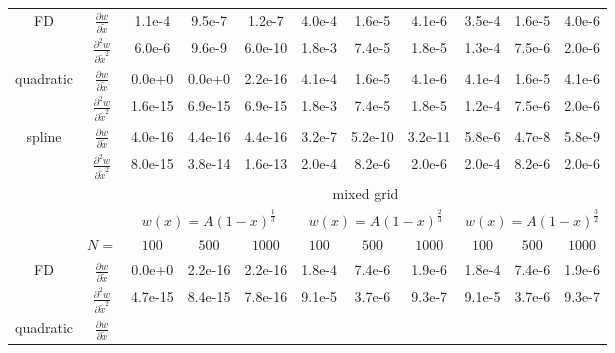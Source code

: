 \begin{tabular}{cc|c|c|c|c|c|c|c|c|c|}
\\ \cline{1-11}
\multicolumn{1}{|c|}{\multirow{2}{*}{FD}} &
\multicolumn{1}{|c|}{$\frac{\partial w}{\partial \tilde x}$}
  &1.1e-4  &9.5e-7  &1.2e-7  &4.0e-4  &1.6e-5  &4.1e-6  &3.5e-4  &1.6e-5  &4.0e-6
\\ \cline{2-11}
\multicolumn{1}{|c|}{}                        &
\multicolumn{1}{|c|}{$\frac{\partial^2 w}{\partial \tilde x^2}$}
  &6.0e-6  &9.6e-9  &6.0e-10  &1.8e-3  &7.4e-5  &1.8e-5  &1.3e-4  &7.5e-6  &2.0e-6
\\ \cline{1-11}
\multicolumn{1}{|c|}{\multirow{2}{*}{quadratic}} &
\multicolumn{1}{|c|}{$\frac{\partial w}{\partial \tilde x}$}
  &0.0e+0  &0.0e+0  &2.2e-16  &4.1e-4  &1.6e-5  &4.1e-6  &4.1e-4  &1.6e-5  &4.1e-6
\\ \cline{2-11}
\multicolumn{1}{|c|}{}                        &
\multicolumn{1}{|c|}{$\frac{\partial^2 w}{\partial \tilde x^2}$}
  &1.6e-15  &6.9e-15  &6.9e-15  &1.8e-3  &7.4e-5  &1.8e-5  &1.2e-4  &7.5e-6  &2.0e-6
\\ \cline{1-11}
\multicolumn{1}{|c|}{\multirow{2}{*}{spline}} &
\multicolumn{1}{|c|}{$\frac{\partial w}{\partial \tilde x}$}
  &4.0e-16  &4.4e-16  &4.4e-16  &3.2e-7  &5.2e-10  &3.2e-11  &5.8e-6  &4.7e-8  &5.8e-9
\\ \cline{2-11}
\multicolumn{1}{|c|}{}                        &
\multicolumn{1}{|c|}{$\frac{\partial^2 w}{\partial \tilde x^2}$}
  &8.0e-15  &3.8e-14  &1.6e-13  &2.0e-4  &8.2e-6  &2.0e-6  &2.0e-4  &8.2e-6  &2.0e-6
\\ \cline{1-11}
& & \multicolumn{9}{|c|}{mixed grid}
\\ \cline{3-11}
& & \multicolumn{3}{|c|}{$w(x)=A(1-x)^\frac{1}{3}$} &  \multicolumn{3}{|c|}{$w(x)=A(1-x)^\frac{2}{3}$} &  \multicolumn{3}{|c|}{$w(x)=A(1-x)^\frac{3}{2}$}
\\ \cline{2-11}
& \multicolumn{1}{|c|}{$N=$} & $100$ & $500$ & $1000$ & $100$ & $500$ & $1000$ & $100$ & $500$ & $1000$
\\ \cline{1-11}
\multicolumn{1}{|c|}{\multirow{2}{*}{FD}} &
\multicolumn{1}{|c|}{$\frac{\partial w}{\partial \tilde x}$}
  &0.0e+0  &2.2e-16  &2.2e-16  &1.8e-4  &7.4e-6  &1.9e-6  &1.8e-4  &7.4e-6  &1.9e-6
\\ \cline{2-11}
\multicolumn{1}{|c|}{}                        &
\multicolumn{1}{|c|}{$\frac{\partial^2 w}{\partial \tilde x^2}$}
  &4.7e-15  &8.4e-15  &7.8e-16  &9.1e-5  &3.7e-6  &9.3e-7  &9.1e-5  &3.7e-6  &9.3e-7
\\ \cline{1-11}
\multicolumn{1}{|c|}{\multirow{2}{*}{quadratic}} &
\multicolumn{1}{|c|}{$\frac{\partial w}{\partial \tilde x}$}

\end{tabular}
